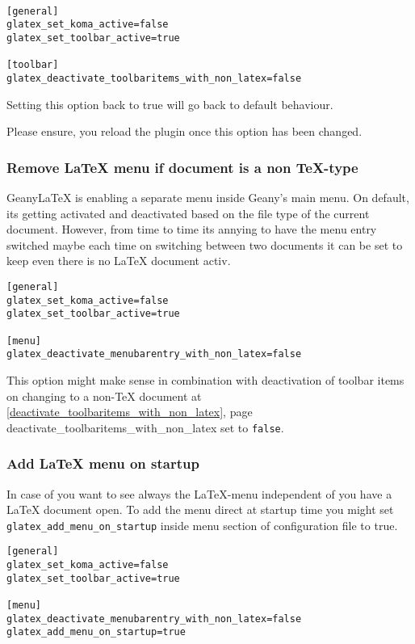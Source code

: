 \documentclass[%
paper=a4,%
fontsize=11pt,%
twoside=false,%
DIV18,%
headsepline,%
plainheadsepline,%
footsepline,%
plainfootsepline,%
bibliography=totoc,%
listof=totoc,%
BCOR10mm,%
parskip=half,%
openany,%
]{scrartcl}
\begin{document}
\begin{lstlisting}[caption={Configuration to enable toolbar buttons if %
						    no \LaTeX{} is active}]

[general]
glatex_set_koma_active=false
glatex_set_toolbar_active=true

[toolbar]
glatex_deactivate_toolbaritems_with_non_latex=false
\end{lstlisting}

Setting this option back to true will go back to default behaviour.

Please ensure, you reload the plugin once this option has been changed.

\subsubsection{Remove \LaTeX{} menu if document is a non \TeX-type}
\label{deactivate_menubarentry_with_non_latex}
Geany\LaTeX{} is enabling a separate menu inside Geany's main menu.
On default, its getting activated and deactivated based on the file
type of the current document. However, from time to time its annying
to have the menu entry switched maybe each time on switching between
two documents it can be set to keep even there is no LaTeX document
activ.

\begin{lstlisting}[caption={Configuration to keep \LaTeX{} menu inside menubar}]
[general]
glatex_set_koma_active=false
glatex_set_toolbar_active=true

[menu]
glatex_deactivate_menubarentry_with_non_latex=false
\end{lstlisting}

This option might make sense in combination with deactivation of
toolbar items on changing to a non-\TeX{} document at
\ref{deactivate_toolbaritems_with_non_latex}, page \pageref
{deactivate_toolbaritems_with_non_latex} set to \texttt{false}.

\subsubsection{Add \LaTeX{} menu on startup}

In case of you want to see always the \LaTeX{}-menu independent of
you have a \LaTeX{} document open. To add the menu direct at startup
time you might set \texttt{glatex\_add\_menu\_on\_startup} inside
menu section of configuration file to true.

\begin{lstlisting}[caption={Configuration add \LaTeX{} menu on startup of Geany}]
[general]
glatex_set_koma_active=false
glatex_set_toolbar_active=true

[menu]
glatex_deactivate_menubarentry_with_non_latex=false
glatex_add_menu_on_startup=true
\end{lstlisting}
\end{document}
